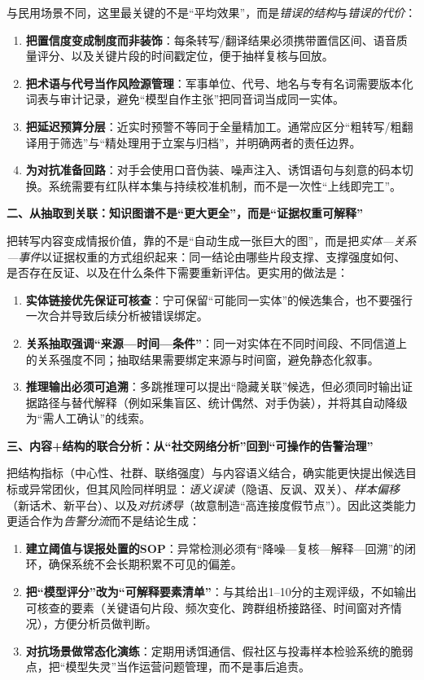 与民用场景不同，这里最关键的不是“平均效果”，而是\emph{错误的结构}与\emph{错误的代价}：
\begin{enumerate}[label=(\arabic*)]
    \item \textbf{把置信度变成制度而非装饰}：每条转写/翻译结果必须携带置信区间、语音质量评分、以及关键片段的时间戳定位，便于抽样复核与回放。
    \item \textbf{把术语与代号当作风险源管理}：军事单位、代号、地名与专有名词需要版本化词表与审计记录，避免“模型自作主张”把同音词当成同一实体。
    \item \textbf{把延迟预算分层}：近实时预警不等同于全量精加工。通常应区分“粗转写/粗翻译用于筛选”与“精处理用于立案与归档”，并明确两者的责任边界。
    \item \textbf{为对抗准备回路}：对手会使用口音伪装、噪声注入、诱饵语句与刻意的码本切换。系统需要有红队样本集与持续校准机制，而不是一次性“上线即完工”。
\end{enumerate}

    {\bfseries 二、从抽取到关联：知识图谱不是“更大更全”，而是“证据权重可解释”}

把转写内容变成情报价值，靠的不是“自动生成一张巨大的图”，而是把\emph{实体—关系—事件}以证据权重的方式组织起来：同一结论由哪些片段支撑、支撑强度如何、是否存在反证、以及在什么条件下需要重新评估。更实用的做法是：
\begin{enumerate}[label=(\arabic*)]
    \item \textbf{实体链接优先保证可核查}：宁可保留“可能同一实体”的候选集合，也不要强行一次合并导致后续分析被错误绑定。
    \item \textbf{关系抽取强调“来源—时间—条件”}：同一对实体在不同时间段、不同信道上的关系强度不同；抽取结果需要绑定来源与时间窗，避免静态化叙事。
    \item \textbf{推理输出必须可追溯}：多跳推理可以提出“隐藏关联”候选，但必须同时输出证据路径与替代解释（例如采集盲区、统计偶然、对手伪装），并将其自动降级为“需人工确认”的线索。
\end{enumerate}

    {\bfseries 三、内容+结构的联合分析：从“社交网络分析”回到“可操作的告警治理”}

把结构指标（中心性、社群、联络强度）与内容语义结合，确实能更快提出候选目标或异常团伙，但其风险同样明显：\emph{语义误读}（隐语、反讽、双关）、\emph{样本偏移}（新话术、新平台）、以及\emph{对抗诱导}（故意制造“高连接度假节点”）。因此这类能力更适合作为\emph{告警分流}而不是结论生成：
\begin{enumerate}[label=(\arabic*)]
    \item \textbf{建立阈值与误报处置的SOP}：异常检测必须有“降噪—复核—解释—回溯”的闭环，确保系统不会长期积累不可见的偏差。
    \item \textbf{把“模型评分”改为“可解释要素清单”}：与其给出1--10分的主观评级，不如输出可核查的要素（关键语句片段、频次变化、跨群组桥接路径、时间窗对齐情况），方便分析员做判断。
    \item \textbf{对抗场景做常态化演练}：定期用诱饵通信、假社区与投毒样本检验系统的脆弱点，把“模型失灵”当作运营问题管理，而不是事后追责。
\end{enumerate}

